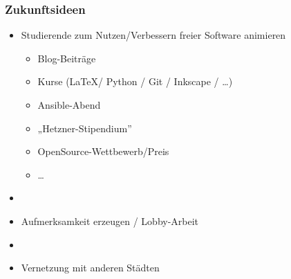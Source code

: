 \documentclass{beamer}
\begin{document}
\begin{frame}[label=ct3]
  \frametitle{Zukunftsideen}

  \begin{itemize}
  \item Studierende zum Nutzen/Verbessern freier Software animieren
    \begin{itemize}
    \item Blog-Beiträge
    \item Kurse (\LaTeX / Python / Git / Inkscape / \dots)
    \item Ansible-Abend
    \item „Hetzner-Stipendium”
    \item OpenSource-Wettbewerb/Preis
    \item \dots
    \end{itemize}

  \item[]
  \item Aufmerksamkeit erzeugen / Lobby-Arbeit
  \item[]
  \item Vernetzung mit anderen Städten

  \end{itemize}

\end{frame}
\end{document}
